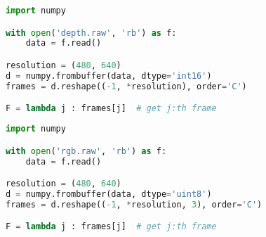 \begin{lstlisting}[language=Python, caption={Code example for parsing depth frames from file}]
import numpy

with open('depth.raw', 'rb') as f:
    data = f.read()

resolution = (480, 640)
d = numpy.frombuffer(data, dtype='int16')
frames = d.reshape((-1, *resolution), order='C')

F = lambda j : frames[j]  # get j:th frame
\end{lstlisting}

\begin{lstlisting}[language=Python, caption={Code example for parsing rgb frames from file}]
import numpy

with open('rgb.raw', 'rb') as f:
    data = f.read()

resolution = (480, 640)
d = numpy.frombuffer(data, dtype='uint8')
frames = d.reshape((-1, *resolution, 3), order='C')

F = lambda j : frames[j]  # get j:th frame
\end{lstlisting}